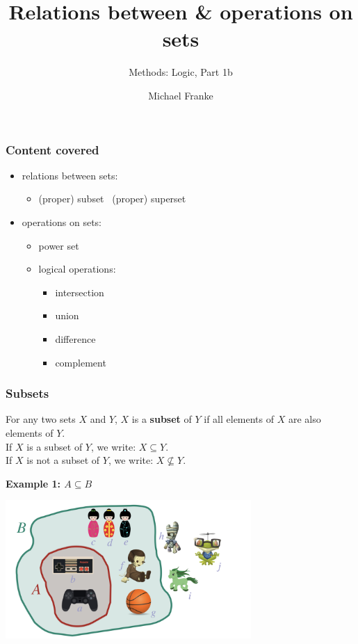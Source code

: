 \documentclass[fleqn,10pt,serif,xcolor=svgnames,xcolor=table,aspectratio=169]{beamer}
\title{Relations between \& operations on sets}
\subtitle{Methods: Logic, Part 1b}
\author{Michael Franke}
\date{}
\begin{document}

\abovedisplayskip=3pt
\abovedisplayshortskip=3pt

\belowdisplayskip=3pt
\belowdisplayshortskip=3pt

\begin{frame}
  \maketitle
\end{frame}

\begin{frame}
  \frametitle{Content covered}

  \begin{itemize}
    \item relations between sets:
    \begin{itemize}
      \item (proper) subset
      \ (proper) superset
    \end{itemize}
    \item operations on sets:
    \begin{itemize}
      \item power set
      \item logical operations:
      \begin{itemize}
        \item intersection
        \item union
        \item difference
        \item complement
      \end{itemize}
    \end{itemize}
  \end{itemize}
\end{frame}

\begin{frame}
  \frametitle{Subsets}

  For any two sets $X$ and $Y$, $X$ is a \textbf{subset} of $Y$ if all elements of $X$ are also elements of $Y$. \\
  If $X$ is a subset of $Y$, we write: $X \subseteq Y$.\\
  If $X$ is not a subset of $Y$, we write: $X \not \subseteq Y$.

  \pause

\hfill  \textbf{Example 1: $A \subseteq B$}

  \hfill \includegraphics[width = 0.7\textwidth]{01b-sets-relations-operations/01b-sets-relations-operations-001.jpeg}

\end{frame}
\end{document}
